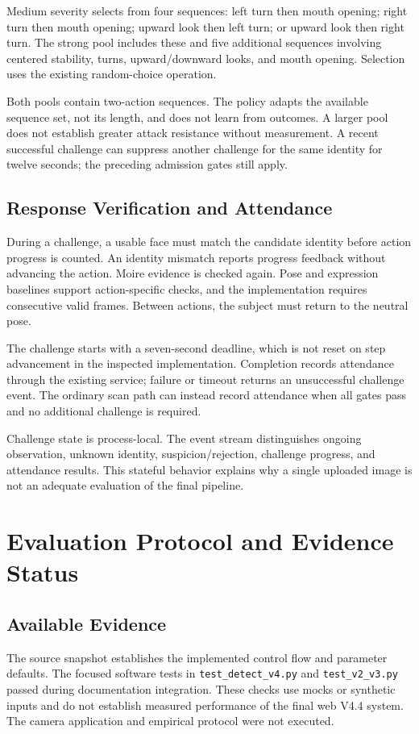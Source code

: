 \documentclass[conference,a4paper]{IEEEtran}
\begin{document}
Medium severity selects from four sequences: left turn then mouth opening; right turn then mouth opening; upward look then left turn; or upward look then right turn. The strong pool includes these and five additional sequences involving centered stability, turns, upward/downward looks, and mouth opening. Selection uses the existing random-choice operation.

Both pools contain two-action sequences. The policy adapts the available sequence set, not its length, and does not learn from outcomes. A larger pool does not establish greater attack resistance without measurement. A recent successful challenge can suppress another challenge for the same identity for twelve seconds; the preceding admission gates still apply.

\subsection{Response Verification and Attendance}
During a challenge, a usable face must match the candidate identity before action progress is counted. An identity mismatch reports progress feedback without advancing the action. Moire evidence is checked again. Pose and expression baselines support action-specific checks, and the implementation requires consecutive valid frames. Between actions, the subject must return to the neutral pose.

The challenge starts with a seven-second deadline, which is not reset on step advancement in the inspected implementation. Completion records attendance through the existing service; failure or timeout returns an unsuccessful challenge event. The ordinary scan path can instead record attendance when all gates pass and no additional challenge is required.

Challenge state is process-local. The event stream distinguishes ongoing observation, unknown identity, suspicion/rejection, challenge progress, and attendance results. This stateful behavior explains why a single uploaded image is not an adequate evaluation of the final pipeline.

\section{Evaluation Protocol and Evidence Status}
\subsection{Available Evidence}
The source snapshot establishes the implemented control flow and parameter defaults. The focused software tests in \texttt{test\_detect\_v4.py} and \texttt{test\_v2\_v3.py} passed during documentation integration. These checks use mocks or synthetic inputs and do not establish measured performance of the final web V4.4 system. The camera application and empirical protocol were not executed.
\end{document}
